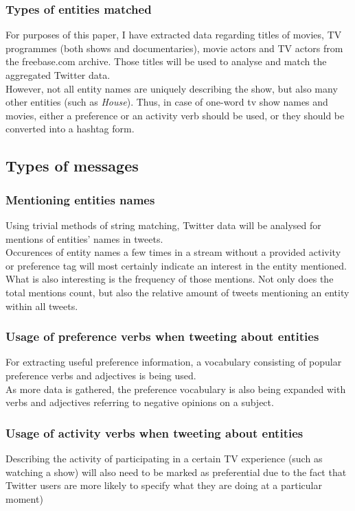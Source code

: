 \documentclass{article}
\begin{document}
\subsubsection{Types of entities matched}
For purposes of this paper, I have extracted data regarding titles of movies, TV
programmes (both shows and documentaries), movie actors and TV actors from the
freebase.com archive. Those titles will be used to analyse and match the
aggregated Twitter data.
\\ However, not all entity names are uniquely describing the show, but also many
other entities (such as \textit{House}). Thus, in case of one-word tv show names and
movies, either a preference or an activity verb should be used, or they should
be converted into a hashtag form.

\subsection{Types of messages}
\subsubsection{Mentioning entities names}
Using trivial methods of string matching, Twitter data will be analysed for
mentions of entities' names in tweets.
\\ Occurences of entity names a few times in a stream without a
provided activity or preference tag will most certainly indicate an interest in
the entity mentioned. 
\\What is also interesting is the frequency of those mentions. Not only does
the total mentions count, but also the relative amount of tweets mentioning an
entity within all tweets.
\subsubsection{Usage of preference verbs when tweeting about entities}
For extracting useful preference information, a vocabulary consisting of
popular preference verbs and adjectives is being used.
\\ As more data is gathered, the preference vocabulary is also being expanded 
with verbs and adjectives referring to negative opinions on a subject.
\subsubsection{Usage of activity verbs when tweeting about entities}
Describing the activity of participating in a certain TV experience (such
as watching a show) will also need to be marked as preferential due to the
fact that Twitter users are more likely to specify what they are doing at a
particular moment)
\end{document}
